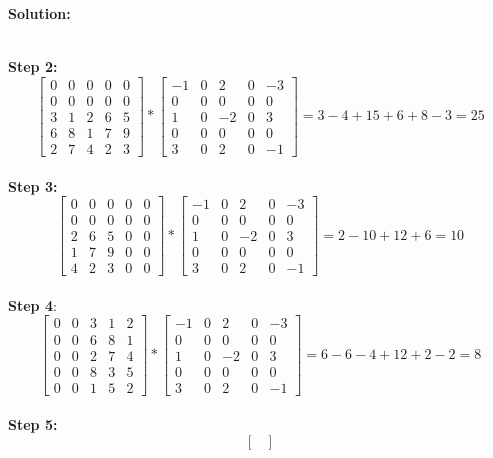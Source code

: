 \documentclass{article}
\newenvironment{solution}
  {\par\noindent\textbf{Solution:}\par}
  {\par}
\begin{document}
\begin{solution}
\[\]
\\ 
\textbf{Step 2:}
\[
\begin{bmatrix}
0 & 0 & 0 & 0 & 0 \\
0 & 0 & 0 & 0 & 0 \\
3 & 1 & 2 & 6 & 5 \\
6 & 8 & 1 & 7 & 9 \\
2 & 7 & 4 & 2 & 3
\end{bmatrix} * \begin{bmatrix}
-1 & 0 & 2 & 0 & -3  \\
0 & 0 & 0 & 0 & 0 \\
1 & 0 & -2 & 0 & 3 \\
0 & 0 & 0 & 0 & 0 \\
3 & 0 & 2 & 0 & -1
\end{bmatrix} = 3 -4 +15+6+8-3 = 25
\]
\\ 
\textbf{Step 3:}
\[ 
\begin{bmatrix}
0 & 0 & 0 & 0 & 0 \\
0 & 0 & 0 & 0 & 0 \\
2 & 6 & 5 & 0 & 0 \\
1 & 7 & 9 & 0 & 0 \\
4 & 2 & 3 & 0 & 0
\end{bmatrix} *  \begin{bmatrix}
-1 & 0 & 2 & 0 & -3  \\
0 & 0 & 0 & 0 & 0 \\
1 & 0 & -2 & 0 & 3 \\
0 & 0 & 0 & 0 & 0 \\
3 & 0 & 2 & 0 & -1
\end{bmatrix} = 2 -10 +12 +6 = 10
\]
\\ 
\textbf{Step 4}: 
\[
\begin{bmatrix}
0 & 0 & 3 & 1 & 2 \\
0 & 0 & 6 & 8 & 1 \\
0 & 0 & 2 & 7 & 4 \\
0 & 0 & 8 & 3 & 5 \\
0 & 0 & 1 & 5 & 2
\end{bmatrix} * \begin{bmatrix}
-1 & 0 & 2 & 0 & -3  \\
0 & 0 & 0 & 0 & 0 \\
1 & 0 & -2 & 0 & 3 \\
0 & 0 & 0 & 0 & 0 \\
3 & 0 & 2 & 0 & -1
\end{bmatrix} = 6 -6 -4 +12 +2 -2 = 8
\]
\\ 
\textbf{Step 5:}
\[
\begin{bmatrix}

\end{bmatrix}\]
\end{solution}
\end{document}
